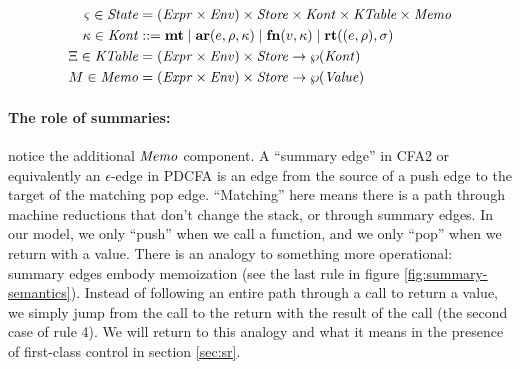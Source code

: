 \documentclass{llncs}
\begin{document}
\begin{align*}
  \varsigma \in \mathit{State} &= (\mathit{Expr} \times \mathit{Env}) \times \mathit{Store} \times \mathit{Kont} \times \mathit{KTable} \times \mathit{Memo} \\
  \kappa \in \mathit{Kont} &::= \mathbf{mt}
                     \mid \mathbf{ar}{}(e,\rho,\kappa) 
                     \mid \mathbf{fn}{}(v,\kappa)
                     \mid \mathbf{rt}((e,\rho),\sigma)\\
  \Xi \in \mathit{KTable} &= (\mathit{Expr} \times \mathit{Env})\times \mathit{Store} \to \wp(\mathit{Kont}) \\
  M \in \mathit{Memo} &= (\mathit{Expr} \times \mathit{Env})\times \mathit{Store} \to \wp(\mathit{Value})
\end{align*}

\paragraph{The role of summaries:} notice the additional $\mathit{Memo}$
component. A ``summary edge'' in CFA2 or equivalently an
$\epsilon$-edge in PDCFA is an edge from the source of a push edge to
the target of the matching pop edge. ``Matching'' here means there is
a path through machine reductions that don't change the stack, or
through summary edges. In our model, we only ``push'' when we call a
function, and we only ``pop'' when we return with a value. There is an
analogy to something more operational: summary edges embody
memoization (see the last rule in figure
\ref{fig:summary-semantics}). Instead of following an entire path
through a call to return a value, we simply jump from the call to the
return with the result of the call (the second case of rule 4). We
will return to this analogy and what it means in the presence of
first-class control in section \ref{sec:sr}.
\end{document}
